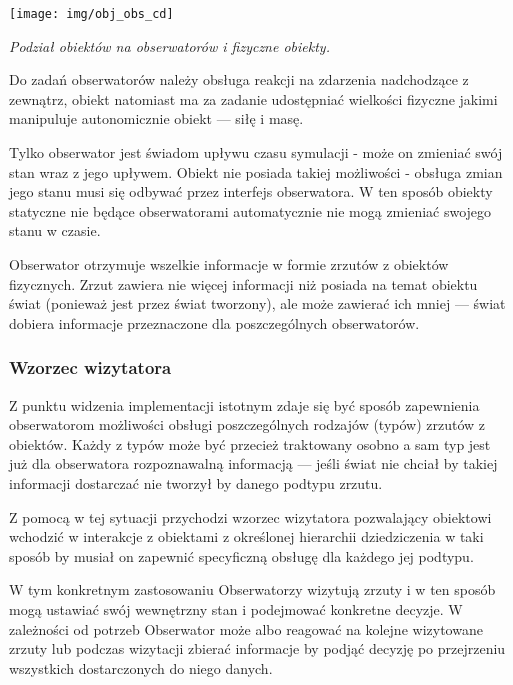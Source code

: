 {\par{
\begin{center}
\texttt{[image: img/obj\_obs\_cd]}
\end{center}
}
\par{
\begin{center}
\textit{Podział obiektów na obserwatorów i fizyczne obiekty.}
\end{center}
}
\par{
Do zadań obserwatorów należy obsługa reakcji na zdarzenia nadchodzące z zewnątrz, obiekt natomiast ma za zadanie udostępniać wielkości fizyczne jakimi manipuluje autonomicznie obiekt --- siłę i masę.
}
\par{
Tylko obserwator jest świadom upływu czasu symulacji - może on zmieniać swój stan wraz z jego upływem. Obiekt nie posiada takiej możliwości - obsługa zmian jego stanu musi się odbywać przez interfejs obserwatora. W ten sposób obiekty statyczne nie będące obserwatorami automatycznie nie mogą zmieniać swojego stanu w czasie.
}
\par{
Obserwator otrzymuje wszelkie informacje w formie zrzutów z obiektów fizycznych. Zrzut zawiera nie więcej informacji niż posiada na temat obiektu świat (ponieważ jest przez świat tworzony), ale może zawierać ich mniej --- świat dobiera informacje przeznaczone dla poszczególnych obserwatorów.
}

\subsubsection{Wzorzec wizytatora}
\par{
Z punktu widzenia implementacji istotnym zdaje się być sposób zapewnienia obserwatorom możliwości obsługi poszczególnych rodzajów (typów) zrzutów z obiektów. Każdy z typów może być przecież traktowany osobno a sam typ jest już dla obserwatora rozpoznawalną informacją --- jeśli świat nie chciał by takiej informacji dostarczać nie tworzył by danego podtypu zrzutu.
}
\par{
Z pomocą w tej sytuacji przychodzi wzorzec wizytatora pozwalający obiektowi wchodzić w interakcje z obiektami z określonej hierarchii dziedziczenia w taki sposób by musiał on zapewnić specyficzną obsługę dla każdego jej podtypu.
}
\par{
W tym konkretnym zastosowaniu Obserwatorzy wizytują zrzuty i w ten sposób mogą ustawiać swój wewnętrzny stan i podejmować konkretne decyzje. W zależności od potrzeb Obserwator może albo reagować na kolejne wizytowane zrzuty lub podczas wizytacji zbierać informacje by podjąć decyzję po przejrzeniu wszystkich dostarczonych do niego danych.
}

}
